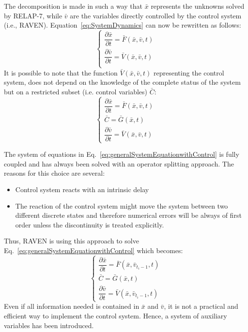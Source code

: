 \documentclass{anstrans}
\begin{document}
The decomposition is made in such a way that $\bar{x}$ represents the unknowns solved by RELAP-7, while $\bar{v}$ are the variables directly controlled by the control system (i.e., RAVEN). Equation~\ref{eq:SystemDynamics} can now be rewritten as follows:
\begin{equation}
\begin{cases} 
\dfrac{\partial \bar{x}}{\partial t} = \bar{F}(\bar{x},\bar{v},t) \\ 
\dfrac{\partial \bar{v}}{\partial t} = \bar{V}(\bar{x},\bar{v},t) \\
\end{cases}
\label{eq:generalSystemEquation}
\end{equation}
It is possible to note that the function $\bar{V}(\bar{x},\bar{v},t)$ representing the control system, does not depend on the knowledge of the complete status of the system but on a restricted subset (i.e. control variables) $\bar{C}$:
\begin{equation}
\begin{cases} 
\dfrac{\partial \bar{x}}{\partial t} = \bar{F}(\bar{x},\bar{v},t) \\
\bar{C} = \bar{G}(\bar{x},t) \\ 
\dfrac{\partial \bar{v}}{\partial t} = \bar{V}(\bar{x},\bar{v},t) 
\end{cases}
\label{eq:generalSystemEquationwithControl}
\end{equation}

The system of equations in Eq.~\ref{eq:generalSystemEquationwithControl} is fully coupled and has always been solved with an operator splitting approach. The reasons for this choice are several:
\begin{itemize}
\item Control system reacts with an intrinsic delay
\item The reaction of the control system might move the system between two different discrete states and
therefore numerical errors will be always of first order unless the discontinuity is treated explicitly.
\end{itemize}
Thus, RAVEN is using this approach to solve Eq.~\ref{eq:generalSystemEquationwithControl} which becomes:
\begin{equation}
\begin{cases} 
\dfrac{\partial \bar{x}}{\partial t} = \bar{F}(\bar{x},\bar{v}_{t_{i}-1},t) \\
\bar{C} = \bar{G}(\bar{x},t) \\ 
\dfrac{\partial \bar{v}}{\partial t} = \bar{V}(\bar{x},\bar{v}_{t_{i}-1},t) 
\end{cases}
\label{eq:generalSystemEquationwithControlSplitting}
\end{equation}
Even if all information needed is contained in $\bar{x}$ and $\bar{v}$, it is not a practical and efficient way to implement the control system. Hence, a system of auxiliary variables has been introduced.
\end{document}
